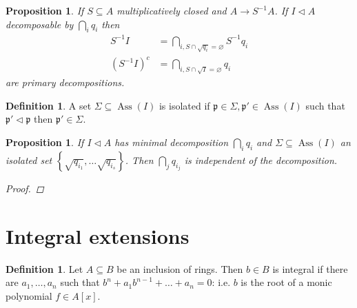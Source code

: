 \documentclass{article}
\newcommand{\set}[1]{\left\{#1\right\}}
\DeclareMathOperator{\Ass}{Ass}
\newcommand{\primeid}{\mathfrak{p}}
\newcommand{\ideal}{\triangleleft}
\newtheorem{proposition}[theorem]{Proposition}
\theoremstyle{definition}
\newtheorem{definition}[theorem]{Definition}
\begin{document}
\begin{proposition}
    If \(S\subseteq A\) multiplicatively closed and \(A\to S^{-1}A\). If
    \(I\ideal A\) decomposable by \(\bigcap_{i}q_{i}\) then
    \begin{align*}
        S^{-1}I       & =\bigcap_{i,S\cap\sqrt{q_{i}}=\varnothing}S^{-1}q_{i} \\
        (S^{-1}I)^{c} & =\bigcap_{i,S\cap\sqrt{I}=\varnothing}q_{i}
    \end{align*}
    are primary decompositions.
\end{proposition}

\begin{definition}
    A set \(\Sigma\subseteq\Ass(I)\) is isolated if
    \(\primeid\in\Sigma,\primeid'\in\Ass(I)\) such that
    \(\primeid'\ideal\primeid\) then \(\primeid'\in\Sigma\).
\end{definition}

\begin{proposition}
    If \(I\ideal A\) has minimal decomposition \(\bigcap_{i}q_{i}\) and
    \(\Sigma\subseteq\Ass(I)\) an isolated set
    \(\set{\sqrt{q_{i_{1}}},\ldots\sqrt{q_{i_{s}}}}\). Then
    \(\bigcap_{j}q_{i_{j}}\) is independent of the decomposition.

    \begin{proof}

    \end{proof}
\end{proposition}

\section{Integral extensions}
\begin{definition}
    Let \(A\subseteq B\) be an inclusion of rings. Then \(b\in B\) is integral
    if there are \(a_{1},\ldots,a_{n}\) such that
    \(b^{n}+a_{1}b^{n-1}+\ldots+a_{n}=0\): i.e. \(b\) is the root
    of a monic polynomial \(f\in A[x]\).
\end{definition}
\end{document}

